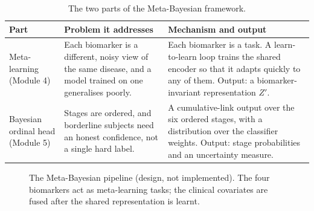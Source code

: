 \documentclass{ssnreview}
\begin{document}
\begin{table}[!htbp]
\centering
\caption{The two parts of the Meta-Bayesian framework.}
\label{tab:metabayes}
\small
\begin{tabularx}{\textwidth}{@{}>{\raggedright\arraybackslash}p{2.6cm}>{\raggedright\arraybackslash}XX@{}}
\toprule
\textbf{Part} & \textbf{Problem it addresses} & \textbf{Mechanism and output} \\
\midrule
Meta-learning (Module 4) & Each biomarker is a different, noisy view of the same
disease, and a model trained on one generalises poorly. &
Each biomarker is a task. A learn-to-learn loop trains the shared encoder so that it
adapts quickly to any of them. Output: a biomarker-invariant representation $Z'$. \\
Bayesian ordinal head (Module 5) & Stages are ordered, and borderline subjects need an
honest confidence, not a single hard label. &
A cumulative-link output over the six ordered stages, with a distribution over the
classifier weights. Output: stage probabilities and an uncertainty measure. \\
\bottomrule
\end{tabularx}
\end{table}

\begin{figure}[!htbp]
\centering
{}
\caption[The Meta-Bayesian pipeline (design, not implemented)]{The Meta-Bayesian pipeline (design, not implemented). The four biomarkers act as
meta-learning tasks; the clinical covariates are fused after the shared representation is
learnt.}
\label{fig:metabayes}
\end{figure}
\end{document}
